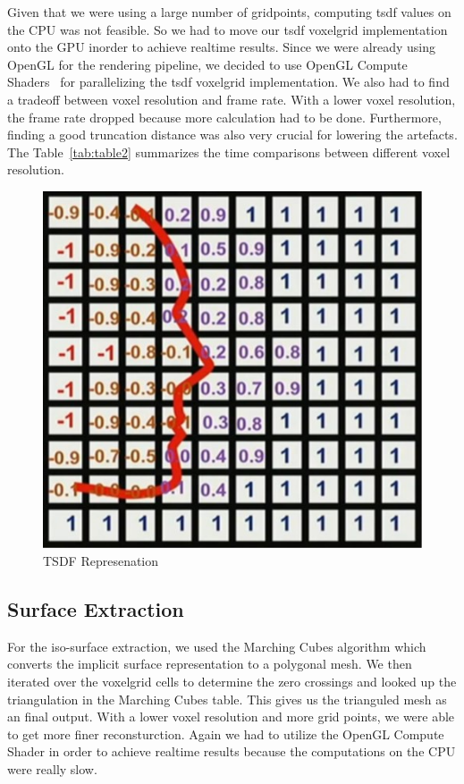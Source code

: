 \documentclass[10pt,twocolumn,letterpaper]{article}
\begin{document}
Given that we were using a large number of gridpoints, computing tsdf values on the CPU was not feasible. So we had to move our tsdf voxelgrid implementation onto the GPU inorder to achieve realtime results. Since we were already using OpenGL for the rendering pipeline, we decided to use OpenGL Compute Shaders~\cite{Authors1} for parallelizing the tsdf voxelgrid implementation. We also had to find a tradeoff between voxel resolution and frame rate. With a lower voxel resolution, the frame rate dropped because more calculation had to be done. Furthermore, finding a good truncation distance was also very crucial for lowering the artefacts. The Table~\ref{tab:table2} summarizes the time comparisons between different voxel resolution.

\begin{figure}[t]
\begin{center}
\includegraphics[width=0.6\linewidth]{imgs/tsdf}
\end{center}
 \caption{TSDF Represenation}
\end{figure}

\subsection{Surface Extraction}
For the iso-surface extraction, we used the Marching Cubes algorithm which converts the implicit surface representation to a polygonal mesh. We then iterated over the voxelgrid cells to determine the zero crossings and looked up the triangulation in the Marching Cubes table. This gives us the trianguled mesh as an final output. With a lower voxel resolution and more grid points, we were able to get more finer reconsturction. Again we had to utilize the OpenGL Compute Shader in order to achieve realtime results because the computations on the CPU were really slow.
\end{document}
